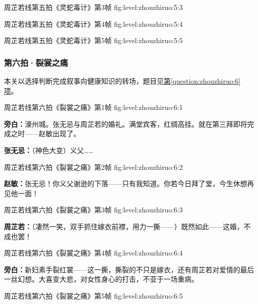   {周芷若线第五拍《灵蛇毒计》第3帧}
  {fig:level:zhouzhiruo:5:3}
  {\scriptsize}
  {\mbox{}}

  {周芷若线第五拍《灵蛇毒计》第4帧}
  {fig:level:zhouzhiruo:5:4}
  {\scriptsize}
  {\mbox{}}

\clearpage

  {周芷若线第五拍《灵蛇毒计》第5帧}
  {fig:level:zhouzhiruo:5:5}
  {\scriptsize}
  {\mbox{}}

\subsubsection{第六拍·裂裳之痛}\label{plot:zhouzhiruo:6}
本关以选择判断完成叙事向健康知识的转场，题目见\hyperref[question:zhouzhiruo:6]{第\ref*{question:zhouzhiruo:6}项}。

  {周芷若线第六拍《裂裳之痛》第1帧}
  {fig:level:zhouzhiruo:6:1}
  {\scriptsize}
  {\textbf{旁白：}濠州城。张无忌与周芷若的婚礼。满堂宾客，红绸高挂。就在第三拜即将完成之时——赵敏出现了。\par
\textbf{张无忌：}（神色大变）义父……\par}

  {周芷若线第六拍《裂裳之痛》第2帧}
  {fig:level:zhouzhiruo:6:2}
  {\scriptsize}
  {\textbf{赵敏：}张无忌！你义父谢逊的下落——只有我知道。你若今日拜了堂，今生休想再见他一面！\par}

\clearpage

  {周芷若线第六拍《裂裳之痛》第3帧}
  {fig:level:zhouzhiruo:6:3}
  {\scriptsize}
  {\textbf{周芷若：}（凄然一笑，双手抓住嫁衣前襟，用力一撕——）既然如此——这婚，不成也罢！\par}

  {周芷若线第六拍《裂裳之痛》第4帧}
  {fig:level:zhouzhiruo:6:4}
  {\scriptsize}
  {\textbf{旁白：}新妇素手裂红裳——这一撕，撕裂的不只是嫁衣，还有周芷若对爱情的最后一丝幻想。大喜变大悲，对女性身心的打击，不亚于一场重病。\par}

  {周芷若线第六拍《裂裳之痛》第5帧}
  {fig:level:zhouzhiruo:6:5}
  {\scriptsize}
  {\mbox{}}

